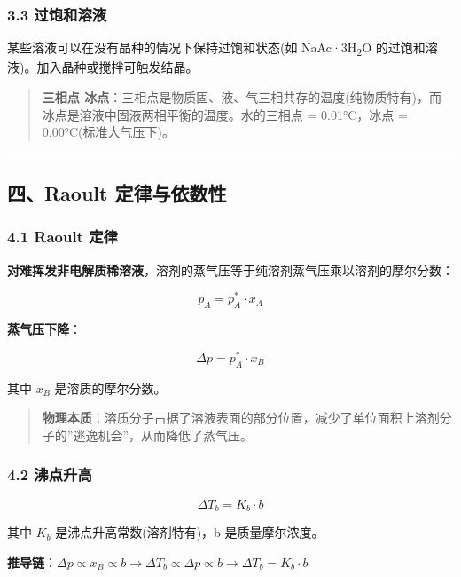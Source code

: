 \subsubsection{3.3 过饱和溶液}\label{ux8fc7ux9971ux548cux6eb6ux6db2}

某些溶液可以在没有晶种的情况下保持过饱和状态(如 NaAc·3H\textsubscript{2}O 的过饱和溶液)。加入晶种或搅拌可触发结晶。

\begin{quote}
\textbf{三相点  冰点}：三相点是物质固、液、气三相共存的温度(纯物质特有)，而冰点是溶液中固液两相平衡的温度。水的三相点 = 0.01°C，冰点 = 0.00°C(标准大气压下)。
\end{quote}

\begin{center}\rule{0.5\linewidth}{0.5pt}\end{center}

\subsection{四、Raoult 定律与依数性}\label{ux56dbraoult-ux5b9aux5f8bux4e0eux4f9dux6570ux6027}

\subsubsection{4.1 Raoult 定律}\label{raoult-ux5b9aux5f8b}

\textbf{对难挥发非电解质稀溶液}，溶剂的蒸气压等于纯溶剂蒸气压乘以溶剂的摩尔分数：

\[
\boxed{p_A = p_A^* \cdot x_A}
\]

\textbf{蒸气压下降}：

\[
\boxed{\Delta p = p_A^* \cdot x_B}
\]

其中 \(x_B\) 是溶质的摩尔分数。

\begin{quote}
\textbf{物理本质}：溶质分子占据了溶液表面的部分位置，减少了单位面积上溶剂分子的''逃逸机会''，从而降低了蒸气压。
\end{quote}

\subsubsection{4.2 沸点升高}\label{ux6cb8ux70b9ux5347ux9ad8}

\[
\boxed{\Delta T_b = K_b \cdot b}
\]

其中 \(K_b\) 是沸点升高常数(溶剂特有)，b 是质量摩尔浓度。

\textbf{推导链}：\(\Delta p \propto x_B \propto b \rightarrow \Delta T_b \propto \Delta p \propto b \rightarrow \Delta T_b = K_b \cdot b\)


